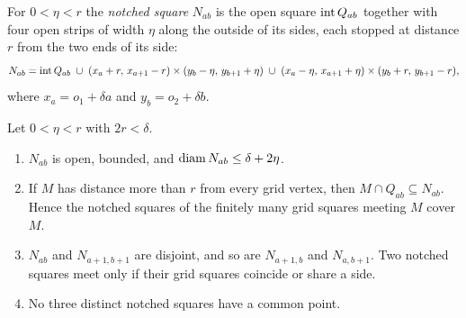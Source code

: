 
For $0<\eta<r$ the \emph{notched square} $N_{ab}$ is the open square $\operatorname{int} Q_{ab}$ together with
four open strips of width $\eta$ along the outside of its sides, each stopped at distance $r$ from the
two ends of its side:
\[
N_{ab}=\operatorname{int} Q_{ab}\;\cup\;(x_a+r,\,x_{a+1}-r)\times(y_b-\eta,\,y_{b+1}+\eta)\;\cup\;
(x_a-\eta,\,x_{a+1}+\eta)\times(y_b+r,\,y_{b+1}-r),
\]
where $x_a=o_1+\delta a$ and $y_b=o_2+\delta b$.

\begin{center}
\end{center}

\begin{lemma}\label{lem:notched}
Let $0<\eta<r$ with $2r<\delta$.
\begin{enumerate}[label=(\alph*)]
\item $N_{ab}$ is open, bounded, and $\operatorname{diam} N_{ab}\le\delta+2\eta$.
\item If $M$ has distance more than $r$ from every grid vertex, then $M\cap Q_{ab}\subseteq N_{ab}$.
Hence the notched squares of the finitely many grid squares meeting $M$ cover $M$.
\item $N_{ab}$ and $N_{a+1,b+1}$ are disjoint, and so are $N_{a+1,b}$ and $N_{a,b+1}$. Two notched
squares meet only if their grid squares coincide or share a side.
\item No three distinct notched squares have a common point.
\end{enumerate}
\end{lemma}

